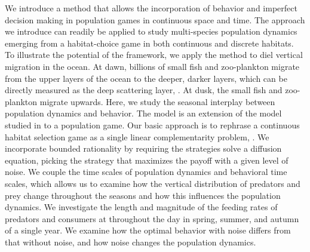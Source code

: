 We introduce a method that allows the incorporation of behavior and imperfect decision making in population games in continuous space and time. The approach we introduce can readily be applied to study multi-species population dynamics emerging from a habitat-choice game in both continuous and discrete habitats. To illustrate the potential of the framework, we apply the method to diel vertical migration in the ocean. At dawn, billions of small fish and zoo-plankton migrate from the upper layers of the ocean to the deeper, darker layers, which can be directly measured as the deep scattering layer, \citep{sutton2013vertical, wang2014seasonal}. At dusk, the small fish and zoo-plankton migrate upwards. Here, we study the seasonal interplay between population dynamics and behavior. The model is an extension of the model studied in \citep{verticalmigration} to a population game. Our basic approach is to rephrase a continuous habitat selection game as a single linear complementarity problem, \citep{miller1991copositive}. We incorporate bounded rationality by requiring the strategies solve a diffusion equation, picking the strategy that maximizes the payoff with a given level of noise.
We couple the time scales of population dynamics and behavioral time scales, which allows us to examine how the vertical distribution of predators and prey change throughout the seasons and how this influences the population dynamics. We investigate the length and magnitude of the feeding rates of predators and consumers at throughout the day in spring, summer, and autumn of a single year. We examine how the optimal behavior with noise differs from that without noise, and how noise changes the population dynamics.


